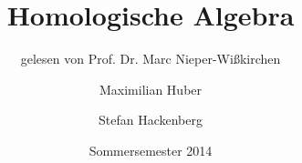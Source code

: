 \documentclass[%
halfparskip*,       %
titlepage,            %
bibtotoc,           %
DIV = 15,
headsepline,
openany,
BCOR=0.8cm,
pointlessnumbers,        %
chapterprefix=true
]
{scrbook}
\theoremstyle{plain}
\theoremstyle{plain}
\theoremstyle{plain}
\theoremstyle{nonumberplain}
\numberwithin{equation}{chapter}
\newcommand{\?}{{\huge \color{red} ?}}
\begin{document}

\frontmatter




\subject{Vorlesungszusammenfassung}
\title{Homologische Algebra}
\subtitle{gelesen von Prof. Dr. Marc Nieper-Wißkirchen}
\author{Maximilian Huber \and Stefan Hackenberg}
\date{Sommersemester 2014}  %


\maketitle             %



\cleardoubleemptypage
\tableofcontents


%
\mainmatter



%
%
%
%
%
%
%
%
%


\nocite{*}
\printbibliography
\end{document}

